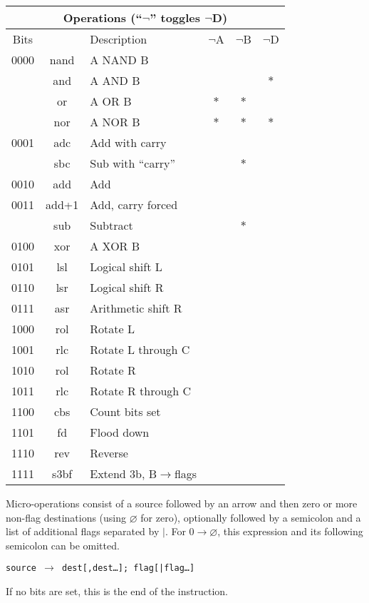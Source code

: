\documentclass[11pt]{book}
\let\emptyset\varnothing
\begin{document}
\begin{multicols}{2}
\columnbreak\noindent
\begin{tabular}{ccl@{}c@{~}c@{~}c}
  \toprule
  \multicolumn{6}{c}{\textbf{Operations}
      (``\(\neg\)'' toggles \(\neg\)D)}\\\midrule
  Bits&&Description&\(\neg\)A&\(\neg\)B&\(\neg\)D\\\midrule
  0000&nand&A NAND B&&&\\
  &and&A AND B&&&\(\ast\)\\
  &or&A OR B&\(\ast\)&\(\ast\)&\\
  &nor&A NOR B&\(\ast\)&\(\ast\)&\(\ast\)\\
  0001&adc&Add with carry&&&\\
  &sbc&Sub with ``carry''&&\(\ast\)&\\
  0010&add&Add&&&\\
  0011&add+1&Add, carry forced&&&\\
      &sub&Subtract&&\(\ast\)&\\
  0100&xor&A XOR B&&&\\
  0101&lsl&Logical shift L&&&\\
  0110&lsr&Logical shift R&&&\\
  0111&asr&Arithmetic shift R&&&\\
  1000&rol&Rotate L&&&\\
  1001&rlc&Rotate L through C&&&\\
  1010&rol&Rotate R&&&\\
  1011&rlc&Rotate R through C&&&\\
  1100&cbs&Count bits set&&&\\
  1101&fd&Flood down&&&\\
  1110&rev&Reverse&&&\\
  1111&s3bf&Extend 3b, B\(\to\)flags&&&\\
  \bottomrule
\end{tabular}

\vspace{\baselineskip}\noindent
Micro-operations consist of a source followed by an arrow
and then zero or more non-flag destinations
(using \(\emptyset\) for zero),
optionally followed by a semicolon
and a list of additional flags separated by \(|\).
For \(0\rightarrow\emptyset\),
this expression and its following semicolon can be omitted.

\begin{center}
\texttt{source \(\rightarrow\) dest[,dest\dots]; flag[|flag\dots]}
\end{center}

\noindent
If no bits are set, this is the end of the instruction.
\end{multicols}
\end{document}

